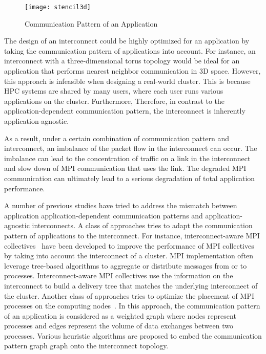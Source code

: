\begin{figure}
    \centering
    \texttt{[image: stencil3d]}
    \caption{Communication Pattern of an Application}%
    \label{fig:stencil3d}
\end{figure}

The design of an interconnect could be highly optimized for an
application by taking the communication pattern of applications into account.
For instance, an interconnect with a three-dimensional torus topology would be
ideal for an application that performs nearest neighbor communication in 3D
space. However, this approach is infeasible when designing a real-world
cluster. This is because HPC systems are shared by many users, where each user
runs various applications on the cluster. Furthermore, Therefore, in contrast
to the application-dependent communication pattern, the interconnect is
inherently application-agnostic.

As a result, under a certain combination of communication pattern and
interconnect, an imbalance of the packet flow in the interconnect can occur.
The imbalance can lead to the concentration of traffic on a link in the
interconnect and slow down of MPI communication that uses the link. The
degraded MPI communication can ultimately lead to a serious degradation of
total application performance.

A  number of previous studies have tried to address the mismatch between
application application-dependent communication patterns and
application-agnostic interconnects. A class of approaches tries to adapt
the communication pattern of applications to the interconnect.
For instance, interconnect-aware MPI
collectives~\autocite{Kumar2016,Kumar2014,Gong2015,Adachi2013} have been
developed to improve the performance of MPI collectives by taking into account
the interconnect of a cluster. MPI implementation often leverage tree-based
algorithms to aggregate or distribute messages from or to processes.
Interconnect-aware MPI collectives use the information on the interconnect to
build a delivery tree that matches the underlying interconnect of the cluster.
Another class of approaches tries to optimize the placement of MPI processes
on the computing nodes~\autocite{Michelogiannakis2017,Hoefler2011,Choi2017}.
In this approach, the communication pattern of an application is considered as
a weighted graph where nodes represent processes and edges represent the
volume of data exchanges between two processes. Various heuristic algorithms
are proposed to embed the communication pattern graph graph onto the
interconnect topology.

